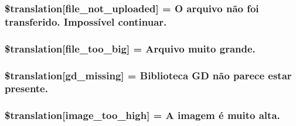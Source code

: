 \subsubsection[{\$translation}]{\setlength{\rightskip}{0pt plus 5cm}\$translation\mbox{[}\textquotesingle{}file\+\_\+not\+\_\+uploaded\textquotesingle{}\mbox{]} = \textquotesingle{}O arquivo não foi transferido. Impossível continuar.\textquotesingle{}}\label{class_8upload_8pt___b_r_8php_a4ce76e7be0b3a03c2b47f6d70c21832e}
\hypertarget{class_8upload_8pt___b_r_8php_a476278eb4a0c3df56af068e2d511a741}{}
\subsubsection[{\$translation}]{\setlength{\rightskip}{0pt plus 5cm}\$translation\mbox{[}\textquotesingle{}file\+\_\+too\+\_\+big\textquotesingle{}\mbox{]} = \textquotesingle{}Arquivo muito grande.\textquotesingle{}}\label{class_8upload_8pt___b_r_8php_a476278eb4a0c3df56af068e2d511a741}
\hypertarget{class_8upload_8pt___b_r_8php_a7f3dfcc0db4bbc0f2e7210c439798e56}{}
\subsubsection[{\$translation}]{\setlength{\rightskip}{0pt plus 5cm}\$translation\mbox{[}\textquotesingle{}gd\+\_\+missing\textquotesingle{}\mbox{]} = \textquotesingle{}Biblioteca G\+D não parece estar presente.\textquotesingle{}}\label{class_8upload_8pt___b_r_8php_a7f3dfcc0db4bbc0f2e7210c439798e56}
\hypertarget{class_8upload_8pt___b_r_8php_aa27bde361343f3b63c7cd441860024f8}{}
\subsubsection[{\$translation}]{\setlength{\rightskip}{0pt plus 5cm}\$translation\mbox{[}\textquotesingle{}image\+\_\+too\+\_\+high\textquotesingle{}\mbox{]} = \textquotesingle{}A imagem é muito alta.\textquotesingle{}}\label{class_8upload_8pt___b_r_8php_aa27bde361343f3b63c7cd441860024f8}
\hypertarget{class_8upload_8pt___b_r_8php_a5c9a4cd67fd21c32e0a3b434591a6037}{}
